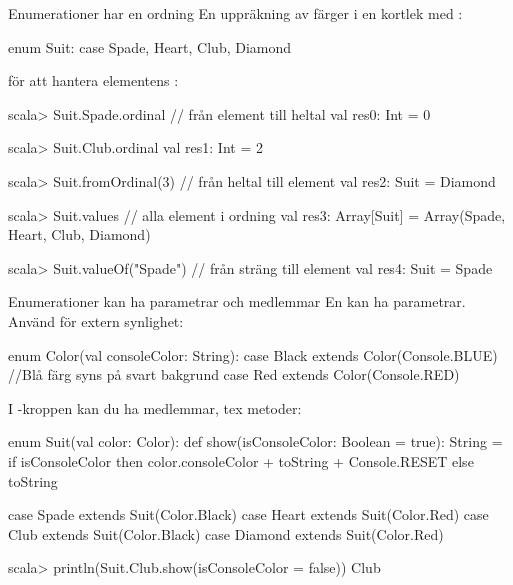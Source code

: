 

\SlideFontSmall
\begin{Slide}{Enumerationer har en ordning}
En uppräkning av färger i en kortlek med :
\begin{Code}
enum Suit:
  case Spade, Heart, Club, Diamond 
\end{Code}
 för att hantera elementens :\\
\begin{REPLsmall}
scala> Suit.Spade.ordinal      // från element till heltal
val res0: Int = 0

scala> Suit.Club.ordinal
val res1: Int = 2

scala> Suit.fromOrdinal(3)    // från heltal till element
val res2: Suit = Diamond

scala> Suit.values            // alla element i ordning
val res3: Array[Suit] = Array(Spade, Heart, Club, Diamond)

scala> Suit.valueOf("Spade")  // från sträng till element
val res4: Suit = Spade
\end{REPLsmall}
\end{Slide}

\begin{Slide}{Enumerationer kan ha parametrar och medlemmar}
En  kan ha parametrar. Använd  för extern synlighet:  
\begin{Code}
enum Color(val consoleColor: String): 
  case Black extends Color(Console.BLUE) //Blå färg syns på svart bakgrund
  case Red   extends Color(Console.RED)
\end{Code}
I -kroppen kan du ha medlemmar, tex metoder:
\begin{Code}
enum Suit(val color: Color):
  def show(isConsoleColor: Boolean = true): String = 
    if isConsoleColor then color.consoleColor + toString + Console.RESET
    else toString

  case Spade   extends Suit(Color.Black)
  case Heart   extends Suit(Color.Red)
  case Club    extends Suit(Color.Black) 
  case Diamond extends Suit(Color.Red)
\end{Code}
\begin{REPLsmall}
scala> println(Suit.Club.show(isConsoleColor = false)) 
Club
\end{REPLsmall}
\end{Slide}


